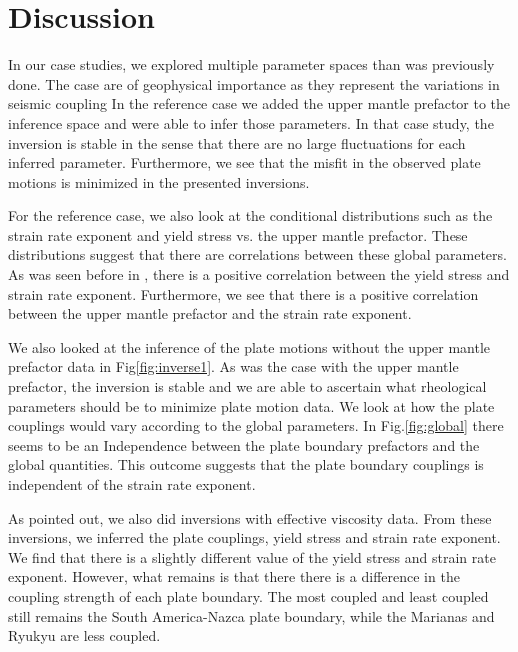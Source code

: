 \documentclass[12pt]{article}
\newcommand{\vrnote}[1]{\textcolor{red}{VR: #1}}
\begin{document}

\section*{Discussion}
In our case studies, we explored multiple parameter spaces than was previously done. The case are of geophysical importance as they represent the variations in seismic coupling  In the reference case we added the upper mantle prefactor to the inference space and were able to infer those parameters. In that case study, the inversion is stable in the sense that there are no large fluctuations for each inferred parameter. Furthermore, we see that the misfit in the observed plate motions is minimized in the presented inversions. %

 For the reference case, we also look at the conditional distributions such as the strain rate exponent and yield stress vs. the upper mantle prefactor. These distributions suggest that there are correlations between these global parameters. As was seen before in \citep{ratnaswamy2015adjoint}, there is a positive correlation between the yield stress and strain rate exponent. Furthermore, we see that there is a positive correlation between the upper mantle prefactor and the strain rate exponent.

We also looked at the inference of the plate motions without the upper mantle prefactor data in Fig\ref{fig:inverse1}. As was the case with the upper mantle prefactor, the inversion is stable and we are able to ascertain what rheological parameters should be to minimize plate motion data. We look at how the plate couplings would vary according to the global parameters. In Fig.\ref{fig:global} there seems to be an Independence between the plate boundary prefactors and the global quantities. This outcome suggests that the plate boundary couplings is independent of the strain rate exponent.

As pointed out, we also did inversions with effective viscosity data. From these inversions, we inferred the plate couplings, yield stress and strain rate exponent. We find that there is a slightly different value of the yield stress and strain rate exponent. However, what remains is that there there is a difference in the coupling strength of each plate boundary. The most coupled and least coupled still remains the South America-Nazca plate boundary, while the Marianas and Ryukyu are less coupled.
\end{document}
